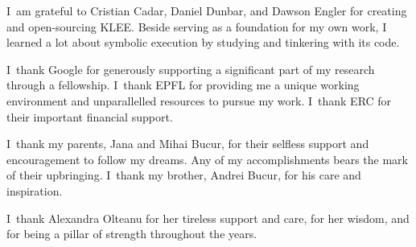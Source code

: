 I~am grateful to Cristian Cadar, Daniel Dunbar, and Dawson Engler for creating and open-sourcing KLEE.  Beside serving as a foundation for my own work, I learned a lot about symbolic execution by studying and tinkering with its code.


I~thank Google for generously supporting a significant part of my research through a fellowship.
%
I~thank EPFL for providing me a unique working environment and unparallelled resources to pursue my work.
%
I~thank ERC for their important financial support.


I~thank my parents, Jana and Mihai Bucur, for their selfless support and encouragement to follow my dreams.  Any of my accomplishments bears the mark of their upbringing.
%
I~thank my brother, Andrei Bucur, for his care and inspiration.


I~thank Alexandra Olteanu for her tireless support and care, for her wisdom, and for being a pillar of strength throughout the years.


